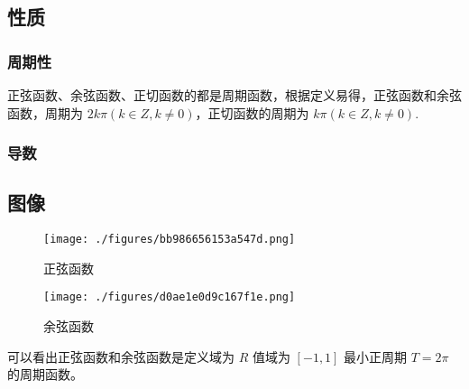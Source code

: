 \subsection{性质}

\subsubsection{周期性}
正弦函数、余弦函数、正切函数的都是周期函数，根据定义易得，正弦函数和余弦函数，周期为 $2k\pi(k\in Z,k\neq0)$，正切函数的周期为 $k\pi(k\in Z,k\neq0)$.
\subsubsection{导数}

\subsection{图像}

\begin{figure}[ht]
\centering
\texttt{[image: ./figures/bb986656153a547d.png]}
\caption{正弦函数} \label{fig_HsTrFu_1}
\end{figure}
\begin{figure}[ht]
\centering
\texttt{[image: ./figures/d0ae1e0d9c167f1e.png]}
\caption{余弦函数} \label{fig_HsTrFu_2}
\end{figure}
可以看出正弦函数和余弦函数是定义域为 $R$ 值域为 $[-1,1]$ 最小正周期 $T = 2\pi$ 的周期函数。

